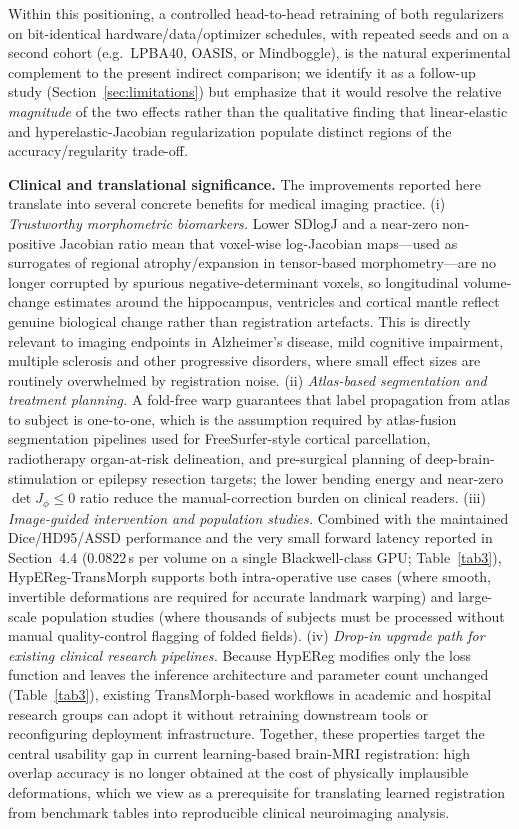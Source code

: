 \documentclass[jimaging,article,submit,pdftex,moreauthors]{Definitions/mdpi}
\begin{document}
Within this positioning, a controlled head-to-head retraining of both regularizers on bit-identical hardware/data/optimizer schedules, with repeated seeds and on a second cohort (e.g.\ LPBA40, OASIS, or Mindboggle), is the natural experimental complement to the present indirect comparison; we identify it as a follow-up study (Section~\ref{sec:limitations}) but emphasize that it would resolve the relative \emph{magnitude} of the two effects rather than the qualitative finding that linear-elastic and hyperelastic-Jacobian regularization populate distinct regions of the accuracy/regularity trade-off.

\noindent\textbf{Clinical and translational significance.}
The improvements reported here translate into several concrete benefits for medical imaging practice. (i) \emph{Trustworthy morphometric biomarkers.} Lower SDlogJ and a near-zero non-positive Jacobian ratio mean that voxel-wise log-Jacobian maps---used as surrogates of regional atrophy/expansion in tensor-based morphometry---are no longer corrupted by spurious negative-determinant voxels, so longitudinal volume-change estimates around the hippocampus, ventricles and cortical mantle reflect genuine biological change rather than registration artefacts. This is directly relevant to imaging endpoints in Alzheimer's disease, mild cognitive impairment, multiple sclerosis and other progressive disorders, where small effect sizes are routinely overwhelmed by registration noise. (ii) \emph{Atlas-based segmentation and treatment planning.} A fold-free warp guarantees that label propagation from atlas to subject is one-to-one, which is the assumption required by atlas-fusion segmentation pipelines used for FreeSurfer-style cortical parcellation, radiotherapy organ-at-risk delineation, and pre-surgical planning of deep-brain-stimulation or epilepsy resection targets; the lower bending energy and near-zero \(\det J_\phi \le 0\) ratio reduce the manual-correction burden on clinical readers. (iii) \emph{Image-guided intervention and population studies.} Combined with the maintained Dice/HD95/ASSD performance and the very small forward latency reported in Section~4.4 ($0.0822$\,s per volume on a single Blackwell-class GPU; Table~\ref{tab3}), HypEReg-TransMorph supports both intra-operative use cases (where smooth, invertible deformations are required for accurate landmark warping) and large-scale population studies (where thousands of subjects must be processed without manual quality-control flagging of folded fields). (iv) \emph{Drop-in upgrade path for existing clinical research pipelines.} Because HypEReg modifies only the loss function and leaves the inference architecture and parameter count unchanged (Table~\ref{tab3}), existing TransMorph-based workflows in academic and hospital research groups can adopt it without retraining downstream tools or reconfiguring deployment infrastructure. Together, these properties target the central usability gap in current learning-based brain-MRI registration: high overlap accuracy is no longer obtained at the cost of physically implausible deformations, which we view as a prerequisite for translating learned registration from benchmark tables into reproducible clinical neuroimaging analysis.
\end{document}

